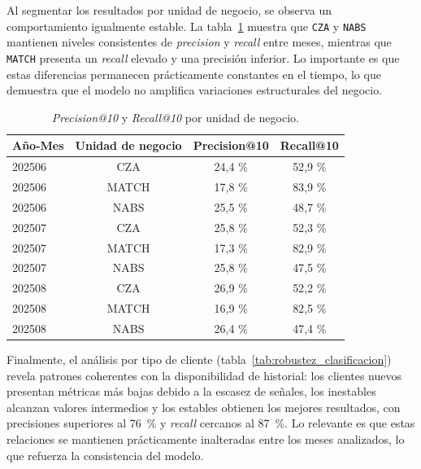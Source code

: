 Al segmentar los resultados por unidad de negocio, se observa un comportamiento igualmente estable. La tabla~\ref{tab:robustez_hb} muestra que \texttt{CZA} y \texttt{NABS} mantienen niveles consistentes de \textit{precision} y \textit{recall} entre meses, mientras que \texttt{MATCH} presenta un \textit{recall} elevado y una precisión inferior. Lo importante es que estas diferencias permanecen prácticamente constantes en el tiempo, lo que demuestra que el modelo no amplifica variaciones estructurales del negocio.

\begin{table}[H]
\centering
\caption[Desempeño por unidad de negocio]{\textit{Precision@10} y \textit{Recall@10} por unidad de negocio.}
\begin{tabular}{lccc}
\toprule
\textbf{Año-Mes} & \textbf{Unidad de negocio} & \textbf{Precision@10} & \textbf{Recall@10} \\
\midrule
202506 & CZA   & 24{,}4 \% & 52{,}9 \% \\
202506 & MATCH & 17{,}8 \% & 83{,}9 \% \\
202506 & NABS  & 25{,}5 \% & 48{,}7 \% \\
202507 & CZA   & 25{,}8 \% & 52{,}3 \% \\
202507 & MATCH & 17{,}3 \% & 82{,}9 \% \\
202507 & NABS  & 25{,}8 \% & 47{,}5 \% \\
202508 & CZA   & 26{,}9 \% & 52{,}2 \% \\
202508 & MATCH & 16{,}9 \% & 82{,}5 \% \\
202508 & NABS  & 26{,}4 \% & 47{,}4 \% \\
\bottomrule
\end{tabular}
\label{tab:robustez_hb}
\end{table}

Finalmente, el análisis por tipo de cliente (tabla~\ref{tab:robustez_clasificacion}) revela patrones coherentes con la disponibilidad de historial: los clientes nuevos presentan métricas más bajas debido a la escasez de señales, los inestables alcanzan valores intermedios y los estables obtienen los mejores resultados, con precisiones superiores al 76~\% y \textit{recall} cercanos al 87~\%. Lo relevante es que estas relaciones se mantienen prácticamente inalteradas entre los meses analizados, lo que refuerza la consistencia del modelo.

